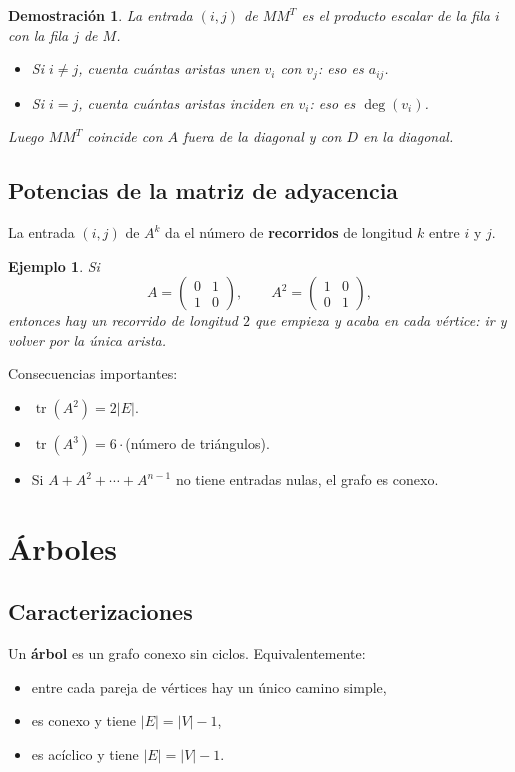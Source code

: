 \documentclass[11pt,a4paper]{article}
\newtheorem*{ej}{Ejemplo}
\newtheorem*{dem}{Demostración}
\begin{document}
\begin{dem}
La entrada $(i,j)$ de $MM^T$ es el producto escalar de la fila $i$ con la fila $j$ de $M$.
\begin{itemize}
    \item Si $i\neq j$, cuenta cuántas aristas unen $v_i$ con $v_j$: eso es $a_{ij}$.
    \item Si $i=j$, cuenta cuántas aristas inciden en $v_i$: eso es $\deg(v_i)$.
\end{itemize}
Luego $MM^T$ coincide con $A$ fuera de la diagonal y con $D$ en la diagonal.
\end{dem}

\subsection{Potencias de la matriz de adyacencia}
La entrada $(i,j)$ de $A^k$ da el número de \textbf{recorridos} de longitud $k$ entre $i$ y $j$.

\begin{ej}
Si
\[
A=\begin{pmatrix}0&1\\1&0\end{pmatrix},\qquad
A^2=\begin{pmatrix}1&0\\0&1\end{pmatrix},
\]
entonces hay un recorrido de longitud $2$ que empieza y acaba en cada vértice: ir y volver por la única arista.
\end{ej}

Consecuencias importantes:
\begin{itemize}
    \item $\operatorname{tr}(A^2)=2|E|$.
    \item $\operatorname{tr}(A^3)=6\cdot$(número de triángulos).
    \item Si $A+A^2+\cdots +A^{n-1}$ no tiene entradas nulas, el grafo es conexo.
\end{itemize}

\section{Árboles}

\subsection{Caracterizaciones}
Un \textbf{árbol} es un grafo conexo sin ciclos. Equivalentemente:
\begin{itemize}
    \item entre cada pareja de vértices hay un único camino simple,
    \item es conexo y tiene $|E|=|V|-1$,
    \item es acíclico y tiene $|E|=|V|-1$.
\end{itemize}
\end{document}
